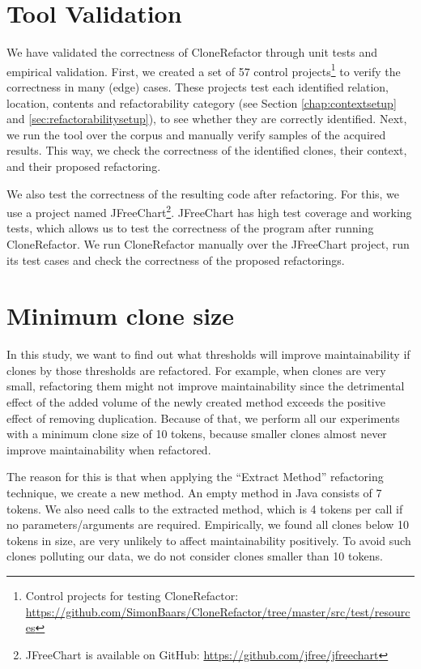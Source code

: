 \section{Tool Validation}
We have validated the correctness of CloneRefactor through unit tests and empirical validation. First, we created a set of 57 control projects\footnote{Control projects for testing CloneRefactor: \url{https://github.com/SimonBaars/CloneRefactor/tree/master/src/test/resources}} to verify the correctness in many (edge) cases. These projects test each identified relation, location, contents and refactorability category (see Section \ref{chap:contextsetup} and \ref{sec:refactorabilitysetup}), to see whether they are correctly identified. Next, we run the tool over the corpus and manually verify samples of the acquired results. This way, we check the correctness of the identified clones, their context, and their proposed refactoring.

We also test the correctness of the resulting code after refactoring. For this, we use a project named JFreeChart\footnote{JFreeChart is available on GitHub: \url{https://github.com/jfree/jfreechart}}. JFreeChart has high test coverage and working tests, which allows us to test the correctness of the program after running CloneRefactor. We run CloneRefactor manually over the JFreeChart project, run its test cases and check the correctness of the proposed refactorings.

\section{Minimum clone size}
In this study, we want to find out what thresholds will improve maintainability if clones by those thresholds are refactored. For example, when clones are very small, refactoring them might not improve maintainability since the detrimental effect of the added volume of the newly created method exceeds the positive effect of removing duplication. Because of that, we perform all our experiments with a minimum clone size of 10 tokens, because smaller clones almost never improve maintainability when refactored.

The reason for this is that when applying the ``Extract Method'' refactoring technique, we create a new method. An empty method in Java consists of 7 tokens. We also need calls to the extracted method, which is 4 tokens per call if no parameters/arguments are required. Empirically, we found all clones below 10 tokens in size, are very unlikely to affect maintainability positively. To avoid such clones polluting our data, we do not consider clones smaller than 10 tokens.

